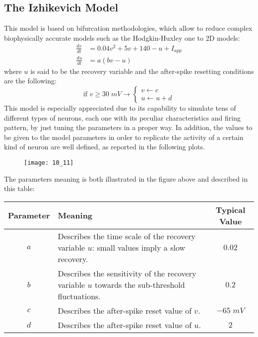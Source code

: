 \subsection{The Izhikevich Model}
This model is based on bifurcation methodologies, which allow to reduce complex biophysically accurate models
such as the Hodgkin-Huxley one to 2D models:
\begin{align*}
    \frac{dv}{dt}&=0.04v^{2}+5v+140-u+I_{app}\\
    \frac{du}{dt}&=a(bv-u)
\end{align*}
where \(u\) is said to be the recovery variable and the after-spike resetting conditions are the following:
\begin{equation*}
    \text{if } v\ge{30\;mV}\rightarrow
    \begin{cases}
        v\leftarrow{c} \\
        u\leftarrow{u+d}
    \end{cases}
\end{equation*}
This model is especially appreciated due to its capability to simulate tens of different types of neurons,
each one with its peculiar characteristics and firing pattern, by just tuning the parameters in a
proper way. In addition, the values to be given to the model parameters in order to replicate the
activity of a certain kind of neuron are well defined, as reported in the following plots.
\begin{figure}[H]
    \texttt{[image: 10\_11]}
    \centering
\end{figure}
The parameters meaning is both illustrated in the figure above and described in this table:
\begin{center}
    \begin{tabular}{ |c|p{8cm}|c| }
        \hline
        \textbf{Parameter} & \textbf{Meaning} & \textbf{Typical Value} \\
        \hline\hline
        \(a\) & Describes the time scale of the recovery variable \(u\): small values imply a slow recovery. & \(0.02\) \\
        \hline
        \(b\) & Describes the sensitivity of the recovery variable \(u\) towards the sub-threshold fluctuations. & \(0.2\) \\
        \hline
        \(c\) & Describes the after-spike reset value of \(v\). & \(-65\;mV\) \\
        \hline
        \(d\) & Describes the after-spike reset value of \(u\). & \(2\) \\
        \hline
    \end{tabular}
\end{center}
